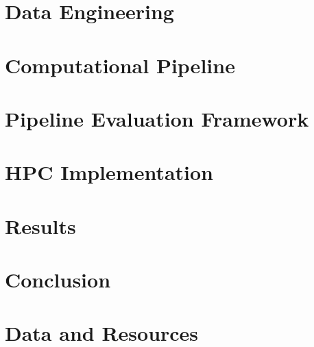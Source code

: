 \documentclass[12pt, a4paper]{report}
\begin{document}
\chapter{Data Engineering}

\chapter{Computational Pipeline}

\chapter{Pipeline Evaluation Framework}

\chapter{HPC Implementation}

\chapter{Results}

\chapter{Conclusion}

\chapter*{Data and Resources}

\appendix

\printbibliography
\end{document}
